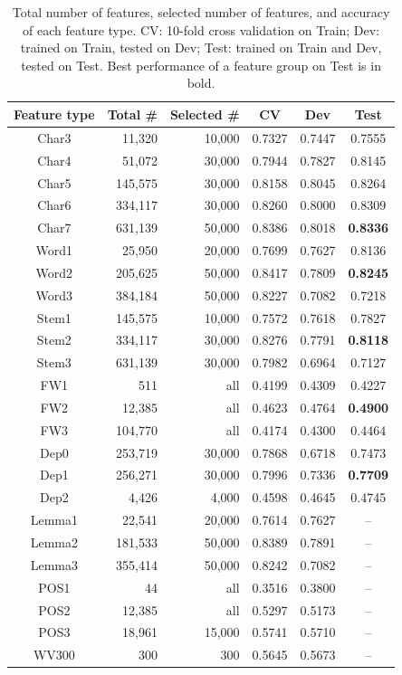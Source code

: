 \documentclass[11pt,letterpaper]{article}
\begin{document}
\begin{table}[h]
\center
\begin{tabular}{|c|rr|ccc|}
\hline
\bf Feature type & \bf Total \# & \bf Selected \# & \bf CV & \bf Dev & \bf Test \\
\hline
Char3 & 11,320 & 10,000 & 0.7327 & 0.7447 & 0.7555 \\
Char4 & 51,072 & 30,000 & 0.7944 & 0.7827 & 0.8145\\
Char5 & 145,575 & 30,000 & 0.8158 & 0.8045 & 0.8264 \\
Char6 & 334,117 & 30,000 & 0.8260 & 0.8000 & 0.8309 \\
Char7 & 631,139 & 50,000 & 0.8386 & 0.8018 & \bf 0.8336 \\
\hline
Word1 & 25,950 & 20,000 & 0.7699 & 0.7627 & 0.8136 \\
Word2 & 205,625 & 50,000 & 0.8417 & 0.7809 & \bf 0.8245 \\
Word3 & 384,184 & 50,000 & 0.8227 & 0.7082 & 0.7218 \\
\hline
Stem1 & 145,575 & 10,000 & 0.7572 & 0.7618 & 0.7827 \\
Stem2 & 334,117 & 30,000 & 0.8276 & 0.7791 & \bf 0.8118 \\
Stem3 & 631,139 & 30,000 & 0.7982 & 0.6964 & 0.7127 \\
\hline
FW1 & 511 & all & 0.4199 & 0.4309 & 0.4227 \\
FW2 & 12,385 & all & 0.4623 & 0.4764 & \bf 0.4900 \\
FW3 & 104,770 & all & 0.4174 & 0.4300 & 0.4464 \\
\hline
Dep0 & 253,719 & 30,000 & 0.7868 & 0.6718 & 0.7473 \\
Dep1 & 256,271 & 30,000 & 0.7996 & 0.7336 & \bf 0.7709 \\
Dep2 & 4,426 & 4,000 & 0.4598 & 0.4645 & 0.4745 \\
\hline
\hline
Lemma1 & 22,541 & 20,000 & 0.7614 & 0.7627 & -- \\
Lemma2 & 181,533 & 50,000 & 0.8389 & 0.7891 & -- \\
Lemma3 & 355,414 & 50,000 & 0.8242 & 0.7082 & -- \\
\hline
POS1 & 44 & all & 0.3516 & 0.3800 & -- \\
POS2 & 12,385 & all & 0.5297 & 0.5173 & -- \\
POS3 & 18,961 & 15,000 & 0.5741 & 0.5710 & -- \\
\hline
WV300 & 300 & 300 & 0.5645 & 0.5673 & -- \\
\hline
\end{tabular}
\caption{Total number of features, selected number of features, and accuracy of each feature type. CV: 10-fold cross validation on Train; Dev: trained on Train, tested on Dev; Test: trained on Train and Dev, tested on Test. Best performance of a feature group on Test is in bold.}
\label{tab:results-1}
\end{table}
\end{document}

